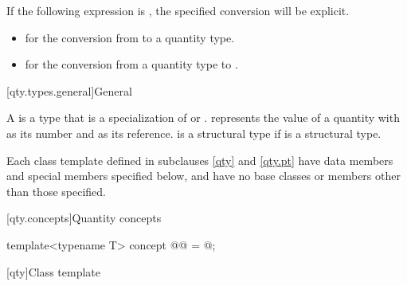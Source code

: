 \pnum
If the following expression is , the specified conversion will be explicit.
\begin{itemize}
\item
{} for the conversion from  to a quantity type.
\item
{} for the conversion from a quantity type to .
\end{itemize}

[qty.types.general]{General}

\pnum
\label{term.quantity.type}
A 
is a type 
that is a specialization of  or .
 represents the value of a quantity
with  as its number
and  as its reference.
 is a structural type
if  is a structural type.

\pnum
Each class template defined in subclauses \ref{qty} and \ref{qty.pt}
have data members and special members specified below, and
have no base classes or members other than those specified.

[qty.concepts]{Quantity concepts}

\begin{itemdecl}
template<typename T>
concept @@ = @\unspecnc@;
\end{itemdecl}

[qty]{Class template }

